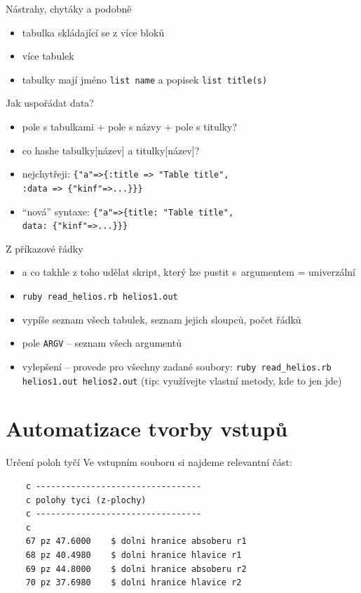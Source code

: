\documentclass{beamer}
\begin{document}
\begin{frame}{Nástrahy, chytáky a podobně}
  \begin{itemize}
    \item tabulka skládající se z více bloků
    \item více tabulek
    \item tabulky mají jméno \texttt{list name} a popisek \texttt{list title(s)}
  \end{itemize}
\end{frame}

\begin{frame}[fragile]{Jak uspořádat data?}
  \begin{itemize}
    \item pole s tabulkami + pole s názvy + pole s titulky?
    \pause
    \item co hashe tabulky[název] a titulky[název]?
    \pause
    \item nejchytřeji: \verb!{"a"=>{:title => "Table title",! \\ \verb!:data => {"kinf"=>...}}}!
    \pause
    \item ``nová'' syntaxe: \verb!{"a"=>{title: "Table title",! \\ \verb!data: {"kinf"=>...}}}!
  \end{itemize}
\end{frame}

\begin{frame}{Z příkazové řádky}
  \begin{itemize}
    \item a co takhle z toho udělat skript, který lze pustit s~argumentem = univerzální
    \item \texttt{ruby read\_helios.rb helios1.out}
    \item vypíše seznam všech tabulek, seznam jejich sloupců, počet řádků
    \item pole \texttt{ARGV} -- seznam všech argumentů
    \item vylepšení – provede pro všechny zadané soubory: \texttt{ruby read\_helios.rb helios1.out helios2.out} (tip: využívejte vlastní metody, kde to jen jde)
  \end{itemize}
\end{frame}

\section{Automatizace tvorby vstupů}

\begin{frame}[fragile]{Určení poloh tyčí}
  Ve vstupním souboru si najdeme relevantní část:
  \scriptsize
  \begin{verbatim}
    c ---------------------------------
    c polohy tyci (z-plochy)
    c ---------------------------------
    c
    67 pz 47.6000    $ dolni hranice absoberu r1
    68 pz 40.4980    $ dolni hranice hlavice r1
    69 pz 44.8000    $ dolni hranice absoberu r2
    70 pz 37.6980    $ dolni hranice hlavice r2
  \end{verbatim}
\end{frame}
\end{document}
